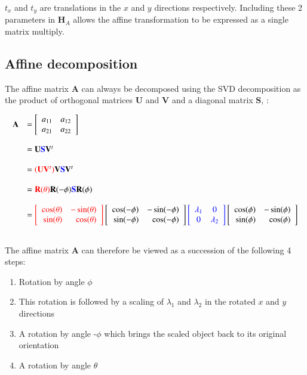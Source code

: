 \documentclass[12pt,letterpaper,doublespaced,ETD]{gt-ece-thesis} %
\begin{document}
\begin{Body}
$t_x$ and $t_y$ are translations in the $x$ and $y$ directions respectively.  Including these 2 parameters in $\mathbf{H}_A$ allows the affine transformation to be expressed as a single matrix multiply.  

\subsection{Affine decomposition}
The affine matrix $\mathbf{A}$ can always be decomposed using the SVD decomposition as the product of orthogonal matrices $\mathbf{U}$ and $\mathbf{V}$ and a diagonal matrix $\mathbf{S}$, \cite{2004_BOOK_CG_Hartley}:

\begin{equation}
\begin{array}{llllllll}
\mathbf{A} &= \left[\begin{array}{lll}a_{11} & a_{12} \\ a_{21} & a_{22}\\ \end{array}\right] \\\\
&=\mathbf{U}{\color{blue}\mathbf{S}}\mathbf{V}^t \\\\
&={\color{red}(\mathbf{U}\mathbf{V}^t)}\mathbf{V}{\color{blue}\mathbf{S}}\mathbf{V}^t\\\\
&={\color{red}\mathbf{R}(\theta)}\mathbf{R}(-\phi){\color{blue}\mathbf{S}}\mathbf{R} (\phi)\\\\
&={\color{red}\left[ \begin{array}{rr} \cos(\theta) & -\sin(\theta) \\ \sin(\theta) & \cos(\theta) \\ \end{array} \right]}\left[ \begin{array}{rr} \cos(-\phi) & -\sin(-\phi) \\ \sin(-\phi) & \cos(-\phi) \\ \end{array} \right]{\color{blue} \left[ \begin{array}{cc} \lambda_1 & 0\\ 0 & \lambda_2 \end{array} \right] }\left[ \begin{array}{rr} \cos(\phi) & -\sin(\phi) \\ \sin(\phi) & \cos(\phi) \\ \end{array} \right]\\\\
\end{array}
\label{Eq:AffineDecomposition}
\end{equation}

The affine matrix $\mathbf{A}$ can therefore be viewed as a succession of the following 4 steps:

\begin{enumerate} 
\item Rotation by angle $\phi$ 
\item This rotation is followed by a scaling of $\lambda_1$ and $\lambda_2$ in the rotated $x$ and $y$ directions
\item A rotation by angle -$\phi$ which brings the scaled object back to its original orientation
\item A rotation by angle $\theta$
\end{enumerate}



\end{Body}
\end{document}
